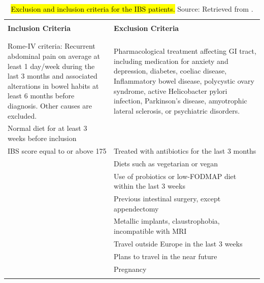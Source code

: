 \documentclass[diagnostics,article,accept,pdftex,moreauthors]{Definitions/mdpi}
\begin{document}
\begin{table}[H]

\tablesize{\fontsize{8}{8}\selectfont}
\caption{\hl{Exclusion and inclusion criteria for the IBS patients.} %
 Source: Retrieved from \cite{berentsen2020study}.\label{tab:criteria}}
\begin{tabularx}{\textwidth}{LL}
\toprule

 & \\
{\normalsize \textbf{Inclusion Criteria}} & {\normalsize \textbf{Exclusion Criteria}}\\
& \\
\hline
& \\


Rome-IV criteria: Recurrent abdominal pain on average at least 1 day/week during the last 3 months and associated alterations in bowel habits at least 6 months before diagnosis. Other causes are excluded. & Pharmacological treatment affecting GI tract, including medication for anxiety and depression, diabetes, coeliac disease, Inflammatory bowel disease, %
polycystic ovary syndrome, active Helicobacter pylori infection, Parkinson’s disease, amyotrophic lateral sclerosis, or psychiatric disorders.\\

Normal diet for at least 3 weeks before inclusion &\\
IBS score equal to or above 175 
& Treated with antibiotics for  the last 3 months\\ 
                                               
& Diets such as vegetarian or vegan\\
& Use of probiotics or low-{FODMAP} diet within the last 3 weeks\\
& Previous intestinal surgery, except appendectomy\\
& Metallic implants, claustrophobia, incompatible with MRI\\
& Travel outside Europe in the last 3 weeks\\
& Plans to travel in the near future \\
& Pregnancy\\
& \\
\hline

\end{tabularx}


\end{table}
\end{document}
